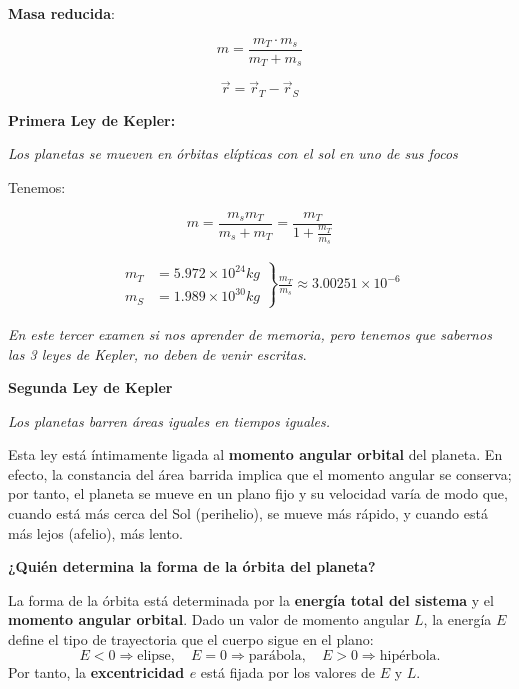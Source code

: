 \documentclass{article}
\begin{document}
\textbf{Masa reducida}:

\[  m = \frac{ m_{T} \cdot m_{s} }{ m_{T} + m_{s} } \]

\[ \vec{r} = \vec{r}_{T} - \vec{r}_{S} \]

\textbf{Primera Ley de Kepler:}

\emph{Los planetas se mueven en órbitas elípticas con el sol en uno de sus focos}


Tenemos:


\[  m = \frac{m_{s} m_{T} }{ m_{s}+m_{T} } = \frac{ m_{T} }{1 + \frac{ m_{T} }{m_{s}}}  \]


\begin{equation}
\begin{split}
\left. \begin{array}{cc}
m_{T} &= 5\text{.}972\times 10^{24} kg\\
m_{S} &= 1\text{.}989\times 10^{30} kg
\end{array} \right\} \frac{m_{T} }{m_{s}} \approx 3\text{.}00251\times10^{-6}
\end{split}
\end{equation}

\emph{En este tercer examen si nos aprender de memoria, pero tenemos que sabernos las 3 leyes de Kepler, no deben de venir escritas}.

\textbf{Segunda Ley de Kepler}

\emph{Los planetas barren áreas iguales en tiempos iguales.}

Esta ley está íntimamente ligada al \textbf{momento angular orbital} del planeta. 
En efecto, la constancia del área barrida implica que el momento angular se conserva; 
por tanto, el planeta se mueve en un plano fijo y su velocidad varía de modo que, 
cuando está más cerca del Sol (perihelio), se mueve más rápido, y cuando está más lejos (afelio), más lento.

\smallskip

\textbf{¿Quién determina la forma de la órbita del planeta?}

La forma de la órbita está determinada por la \textbf{energía total del sistema} y el 
\textbf{momento angular orbital}. Dado un valor de momento angular $L$, la energía $E$ 
define el tipo de trayectoria que el cuerpo sigue en el plano:
\[
E < 0 \Rightarrow \text{elipse}, \quad
E = 0 \Rightarrow \text{parábola}, \quad
E > 0 \Rightarrow \text{hipérbola.}
\]
Por tanto, la \textbf{excentricidad $e$} está fijada por los valores de $E$ y $L$.

\smallskip
\end{document}
